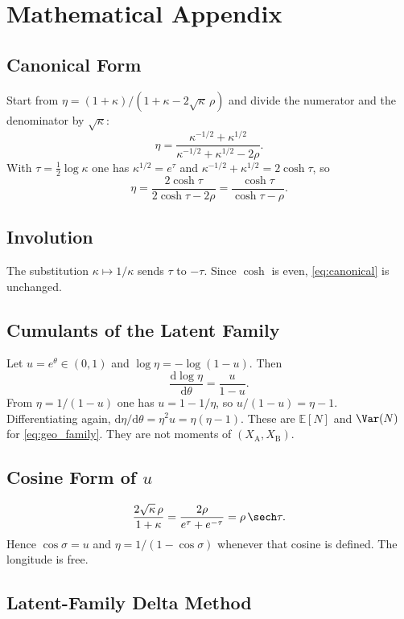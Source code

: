 \section{Mathematical Appendix}
\label{sec:appendix}

\subsection{Canonical Form}
\label{sec:appendix_canonical}

Start from $\eta = (1+\kappa)/(1+\kappa-2\sqrt{\kappa}\,\rho)$ and divide the numerator and the denominator by $\sqrt{\kappa}$:
\[
  \eta
  = \frac{\kappa^{-1/2}+\kappa^{1/2}}{\kappa^{-1/2}+\kappa^{1/2}-2\rho}.
\]
With $\tau = \tfrac{1}{2}\log\kappa$ one has $\kappa^{1/2} = e^{\tau}$ and $\kappa^{-1/2}+\kappa^{1/2} = 2\cosh\tau$, so
\[
  \eta = \frac{2\cosh\tau}{2\cosh\tau-2\rho} = \frac{\cosh\tau}{\cosh\tau-\rho}.
\]

\subsection{Involution}

The substitution $\kappa\mapsto 1/\kappa$ sends $\tau$ to $-\tau$.
Since $\cosh$ is even, \cref{eq:canonical} is unchanged.

\subsection{Cumulants of the Latent Family}

Let $u = e^{\theta}\in(0,1)$ and $\log\eta = -\log(1-u)$.
Then
\[
  \frac{\mathrm{d}\log\eta}{\mathrm{d}\theta}
  = \frac{u}{1-u}.
\]
From $\eta = 1/(1-u)$ one has $u = 1-1/\eta$, so $u/(1-u) = \eta-1$.
Differentiating again, $\mathrm{d}\eta/\mathrm{d}\theta = \eta^{2} u = \eta(\eta-1)$.
These are $\mathbb{E}[N]$ and $\Var(N)$ for \cref{eq:geo_family}.
They are not moments of $(X_{\mathrm{A}},X_{\mathrm{B}})$.

\subsection{Cosine Form of \texorpdfstring{$u$}{u}}

\[
  \frac{2\sqrt{\kappa}\,\rho}{1+\kappa}
  = \frac{2\rho}{e^{\tau}+e^{-\tau}}
  = \rho\,\sech\tau.
\]
Hence $\cos\sigma = u$ and $\eta = 1/(1-\cos\sigma)$ whenever that cosine is defined.
The longitude is free.

\subsection{Latent-Family Delta Method}

